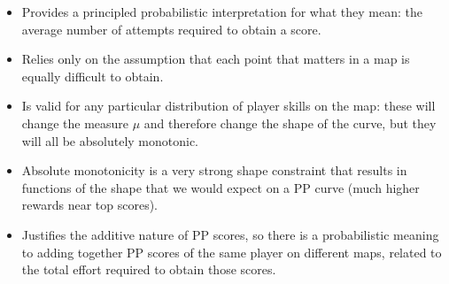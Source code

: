 \documentclass[12pt,a4paper]{article}
\begin{document}
\begin{itemize}
\item Provides a principled probabilistic interpretation for what they mean: the average number of attempts required to obtain a score.
\item Relies only on the assumption that each point that matters in a map is equally difficult to obtain.
\item Is valid for any particular distribution of player skills on the map: these will change the measure $\mu$ and therefore change the shape of the curve, but they will all be absolutely monotonic.
\item Absolute monotonicity is a very strong shape constraint that results in functions of the shape that we would expect on a PP curve (much higher rewards near top scores).
\item Justifies the additive nature of PP scores, so there is a probabilistic meaning to adding together PP scores of the same player on different maps, related to the total effort required to obtain those scores.
\end{itemize}

\end{document}
